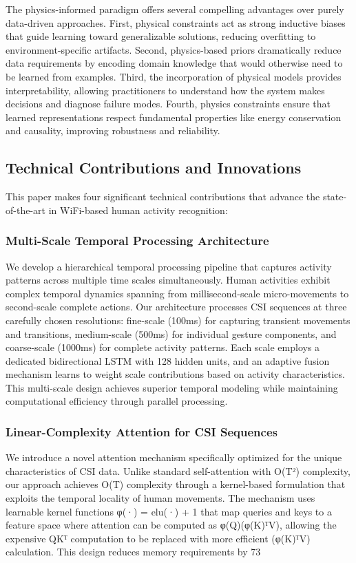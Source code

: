 \documentclass[10pt,journal,compsoc]{IEEEtran}
\begin{document}
The physics-informed paradigm offers several compelling advantages over purely data-driven approaches. First, physical constraints act as strong inductive biases that guide learning toward generalizable solutions, reducing overfitting to environment-specific artifacts. Second, physics-based priors dramatically reduce data requirements by encoding domain knowledge that would otherwise need to be learned from examples. Third, the incorporation of physical models provides interpretability, allowing practitioners to understand how the system makes decisions and diagnose failure modes. Fourth, physics constraints ensure that learned representations respect fundamental properties like energy conservation and causality, improving robustness and reliability.

\subsection{Technical Contributions and Innovations}

This paper makes four significant technical contributions that advance the state-of-the-art in WiFi-based human activity recognition:

\subsubsection{Multi-Scale Temporal Processing Architecture}
We develop a hierarchical temporal processing pipeline that captures activity patterns across multiple time scales simultaneously. Human activities exhibit complex temporal dynamics spanning from millisecond-scale micro-movements to second-scale complete actions. Our architecture processes CSI sequences at three carefully chosen resolutions: fine-scale (100ms) for capturing transient movements and transitions, medium-scale (500ms) for individual gesture components, and coarse-scale (1000ms) for complete activity patterns. Each scale employs a dedicated bidirectional LSTM with 128 hidden units, and an adaptive fusion mechanism learns to weight scale contributions based on activity characteristics. This multi-scale design achieves superior temporal modeling while maintaining computational efficiency through parallel processing.

\subsubsection{Linear-Complexity Attention for CSI Sequences}
We introduce a novel attention mechanism specifically optimized for the unique characteristics of CSI data. Unlike standard self-attention with O(T²) complexity, our approach achieves O(T) complexity through a kernel-based formulation that exploits the temporal locality of human movements. The mechanism uses learnable kernel functions φ(·) = elu(·) + 1 that map queries and keys to a feature space where attention can be computed as φ(Q)(φ(K)ᵀV), allowing the expensive QKᵀ computation to be replaced with more efficient (φ(K)ᵀV) calculation. This design reduces memory requirements by 73%
\end{document}
